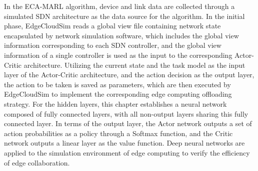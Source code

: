 In the ECA-MARL algorithm, device and link data are collected through a simulated SDN architecture as the data source for the algorithm. In the initial phase, EdgeCloudSim reads a global view file containing network state encapsulated by network simulation software, which includes the global view information corresponding to each SDN controller, and the global view information of a single controller is used as the input to the corresponding Actor-Critic architecture. Utilizing the current state and the task model as the input layer of the Actor-Critic architecture, and the action decision as the output layer, the action to be taken is saved as parameters, which are then executed by EdgeCloudSim to implement the corresponding edge computing offloading strategy. For the hidden layers, this chapter establishes a neural network composed of fully connected layers, with all non-output layers sharing this fully connected layer. In terms of the output layer, the Actor network outputs a set of action probabilities as a policy through a Softmax function, and the Critic network outputs a linear layer as the value function. Deep neural networks are applied to the simulation environment of edge computing to verify the efficiency of edge collaboration.
